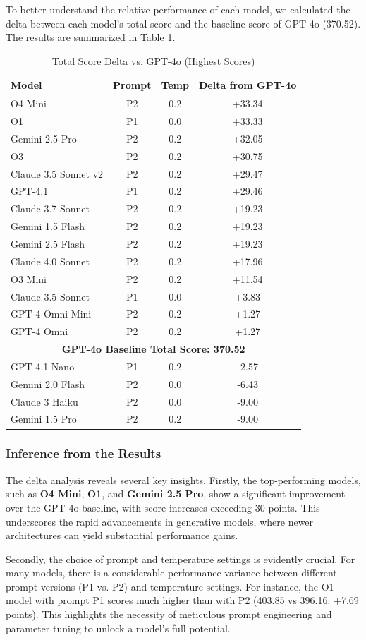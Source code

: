 To better understand the relative performance of each model, we calculated the delta between each model's total score and the baseline score of GPT-4o (370.52). The results are summarized in Table \ref{tab:deepeval_delta_results}.

\begin{table}[!htbp]
\centering
\small
\caption{Total Score Delta vs. GPT-4o (Highest Scores)}
\label{tab:deepeval_delta_results}
\begin{tabular}{|l|c|c|c|}
\hline
\textbf{Model} & \textbf{Prompt} & \textbf{Temp} & \textbf{Delta from GPT-4o} \\
\hline
O4 Mini & P2 & 0.2 & +33.34 \\
O1 & P1 & 0.0 & +33.33 \\
Gemini 2.5 Pro & P2 & 0.2 & +32.05 \\
O3 & P2 & 0.2 & +30.75 \\
Claude 3.5 Sonnet v2 & P2 & 0.2 & +29.47 \\
GPT-4.1 & P1 & 0.2 & +29.46 \\
Claude 3.7 Sonnet & P2 & 0.2 & +19.23 \\
Gemini 1.5 Flash & P2 & 0.2 & +19.23 \\
Gemini 2.5 Flash & P2 & 0.2 & +19.23 \\
Claude 4.0 Sonnet & P2 & 0.2 & +17.96 \\
O3 Mini & P2 & 0.2 & +11.54 \\
Claude 3.5 Sonnet & P1 & 0.0 & +3.83 \\
GPT-4 Omni Mini & P2 & 0.2 & +1.27 \\
GPT-4 Omni & P2 & 0.2 & +1.27 \\
\hline
\multicolumn{4}{|c|}{\textbf{GPT-4o Baseline Total Score: 370.52}} \\
\hline
GPT-4.1 Nano & P1 & 0.2 & -2.57 \\
Gemini 2.0 Flash & P2 & 0.0 & -6.43 \\
Claude 3 Haiku & P2 & 0.0 & -9.00 \\
Gemini 1.5 Pro & P2 & 0.2 & -9.00 \\
\hline
\end{tabular}
\end{table}

\subsubsection{Inference from the Results}
The delta analysis reveals several key insights. Firstly, the top-performing models, such as \textbf{O4 Mini}, \textbf{O1}, and \textbf{Gemini 2.5 Pro}, show a significant improvement over the GPT-4o baseline, with score increases exceeding 30 points. This underscores the rapid advancements in generative models, where newer architectures can yield substantial performance gains.

Secondly, the choice of prompt and temperature settings is evidently crucial. For many models, there is a considerable performance variance between different prompt versions (P1 vs. P2) and temperature settings. For instance, the O1 model with prompt P1 scores much higher than with P2 (403.85 vs 396.16: +7.69 points). This highlights the necessity of meticulous prompt engineering and parameter tuning to unlock a model's full potential.